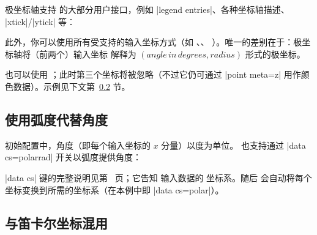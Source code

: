 {极坐标轴支持 \PGFPlots{} 的大部分用户接口，例如 |legend entries|、各种坐标轴描述、
|xtick|/|ytick| 等：
%
\begin{codeexample}[]
\end{codeexample}
%
\noindent 此外，你可以使用所有受支持的输入坐标方式（如
、、
）。唯一的差别在于：极坐标轴将（前两个）输入坐标
解释为 $(\mathit{angle\,in\,degrees},\mathit{radius})$ 形式的极坐标。

也可以使用 ；此时第三个坐标将被忽略（不过它仍可通过
|point meta=z| 用作颜色数据）。示例见下文第~\ref{sec:polar:cart} 节。


\subsection{使用弧度代替角度}

初始配置中，角度（即每个输入坐标的 $x$ 分量）以度为单位。\PGFPlots{} 也支持通过
|data cs=polarrad| 开关以弧度提供角度：
%
\begin{codeexample}[]
\end{codeexample}

|data cs| 键的完整说明见第~\pageref{key:data:cs} 页；它告知 \PGFPlots{} 输入数据的
坐标系。随后 \PGFPlots{} 会自动将每个坐标变换到所需的坐标系（在本例中即
|data cs=polar|）。


\subsection{与笛卡尔坐标混用}
\label{sec:polar:cart}

}
